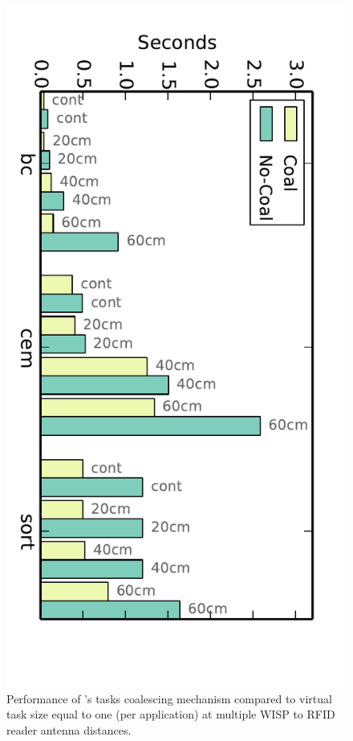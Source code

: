 \begin{figure}
	\centering
	\includegraphics[width=\columnwidth]{figures/coalescing}
	\caption{Performance of \sys's  tasks coalescing mechanism compared to virtual task size equal to one (per application) at multiple WISP to RFID reader antenna distances.}
	\label{fig:coalescing}
\end{figure}

